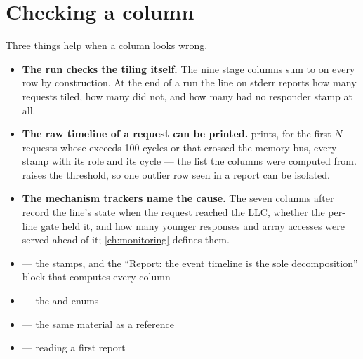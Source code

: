 \section{Checking a column}

Three things help when a column looks wrong.

\begin{itemize}
\item \textbf{The run checks the tiling itself.} The nine stage columns sum to  on
  every row by construction. At the end of a run the  line on stderr reports
  how many requests tiled, how many did not, and how many had no responder stamp at all.
\item \textbf{The raw timeline of a request can be printed.} 
  prints, for the first $N$ requests whose  exceeds 100 cycles or that crossed the
  memory bus, every stamp with its role and its cycle --- the list the columns were computed
  from.  raises the threshold, so one outlier row
  seen in a report can be isolated.
\item \textbf{The mechanism trackers name the cause.} The seven columns after  record
  the line's state when the request reached the LLC, whether the per-line gate held it, and how
  many younger responses and array accesses were served ahead of it; \cref{ch:monitoring}
  defines them.
\end{itemize}

\begin{wherebox}
\begin{itemize}[nosep,leftmargin=1.2em]
\item {} --- the stamps,  and the ``Report: the event timeline is the sole decomposition'' block that computes every column
\item {} --- the  and  enums
\item {} --- the same material as a reference
\item {} --- reading a first report
\end{itemize}
\end{wherebox}

